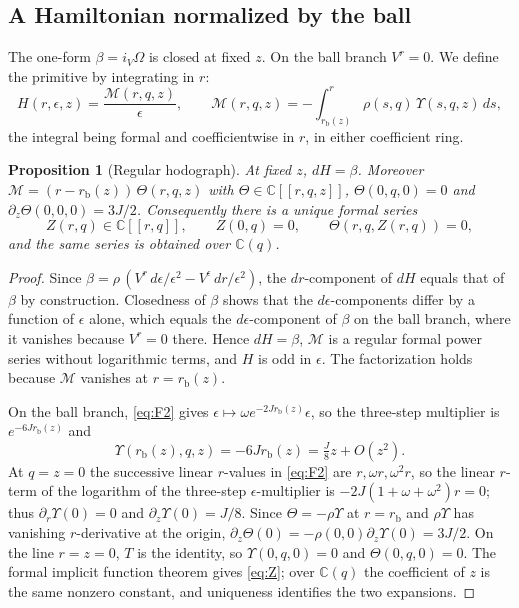 \documentclass[11pt]{amsart}
\numberwithin{equation}{section}
\newtheorem{proposition}[theorem]{Proposition}
\theoremstyle{definition}
\theoremstyle{remark}
\newcommand{\C}{\mathbb{C}}
\newcommand{\rb}{r_{\mathrm b}}
\begin{document}
\subsection{A Hamiltonian normalized by the ball}
The one-form $\beta=i_V\Omega$ is closed at fixed $z$. On the ball branch $V^r=0$. We define the primitive by integrating in $r$:
\begin{equation}\label{eq:Ham}
H(r,\epsilon,z)=\frac{\mathcal M(r,q,z)}\epsilon,\qquad \mathcal M(r,q,z)=-\int_{\rb(z)}^r\rho(s,q)\,\Upsilon(s,q,z)\,ds ,
\end{equation}
the integral being formal and coefficientwise in $r$, in either coefficient ring.

\begin{proposition}[Regular hodograph]\label{prop:hodograph}
At fixed $z$, $dH=\beta$. Moreover $\mathcal M=(r-\rb(z))\,\Theta(r,q,z)$ with $\Theta\in\C[[r,q,z]]$, $\Theta(0,q,0)=0$ and $\partial_z\Theta(0,0,0)=3J/2$. Consequently there is a unique formal series
\begin{equation}\label{eq:Z}
Z(r,q)\in\C[[r,q]],\qquad Z(0,q)=0,\qquad \Theta(r,q,Z(r,q))=0 ,
\end{equation}
and the same series is obtained over $\C(q)$.
\end{proposition}

\begin{proof}
Since $\beta=\rho\,(V^r\,d\epsilon/\epsilon^2-V^\epsilon\,dr/\epsilon^2)$, the $dr$-component of $dH$ equals that of $\beta$ by construction. Closedness of $\beta$ shows that the $d\epsilon$-components differ by a function of $\epsilon$ alone, which equals the $d\epsilon$-component of $\beta$ on the ball branch, where it vanishes because $V^r=0$ there. Hence $dH=\beta$, $\mathcal M$ is a regular formal power series without logarithmic terms, and $H$ is odd in $\epsilon$. The factorization holds because $\mathcal M$ vanishes at $r=\rb(z)$.

On the ball branch, \eqref{eq:F2} gives $\epsilon\mapsto\omega e^{-2J\rb(z)}\epsilon$, so the three-step multiplier is $e^{-6J\rb(z)}$ and
\begin{equation}\label{eq:Uball}
\Upsilon(\rb(z),q,z)=-6J\rb(z)=\tfrac J8z+O(z^2).
\end{equation}
At $q=z=0$ the successive linear $r$-values in \eqref{eq:F2} are $r,\omega r,\omega^2r$, so the linear $r$-term of the logarithm of the three-step $\epsilon$-multiplier is $-2J(1+\omega+\omega^2)r=0$; thus $\partial_r\Upsilon(0)=0$ and $\partial_z\Upsilon(0)=J/8$. Since $\Theta=-\rho\Upsilon$ at $r=\rb$ and $\rho\Upsilon$ has vanishing $r$-derivative at the origin, $\partial_z\Theta(0)=-\rho(0,0)\partial_z\Upsilon(0)=3J/2$. On the line $r=z=0$, $T$ is the identity, so $\Upsilon(0,q,0)=0$ and $\Theta(0,q,0)=0$. The formal implicit function theorem gives \eqref{eq:Z}; over $\C(q)$ the coefficient of $z$ is the same nonzero constant, and uniqueness identifies the two expansions.
\end{proof}
\end{document}
